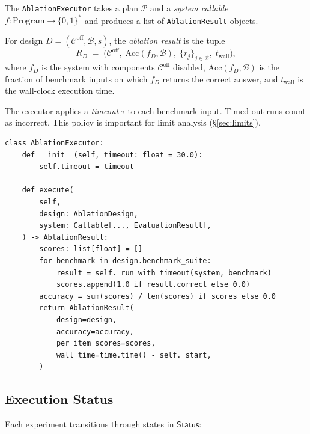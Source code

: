 \documentclass[11pt]{article}
\newcommand{\Acc}{\mathrm{Acc}}             %
\newcommand{\CompSet}{\mathcal{C}}          %
\newcommand{\AblStatus}{\mathsf{Status}}    %
\begin{document}
The \texttt{AblationExecutor} takes a plan $\mathcal{P}$ and a
\emph{system callable} $f : \mathrm{Program} \to \{0,1\}^*$ and
produces a list of \texttt{AblationResult} objects.

\begin{definition}
\label{def:ablation-result}
For design $D = (\CompSet^{\mathrm{off}}, \mathcal{B}, s)$, the
\emph{ablation result} is the tuple
\[
  R_D \;=\; \bigl(\CompSet^{\mathrm{off}},\;\Acc(f_D, \mathcal{B}),\;
             \{r_j\}_{j \in \mathcal{B}},\; t_{\mathrm{wall}}\bigr),
\]
where $f_D$ is the system with components $\CompSet^{\mathrm{off}}$
disabled, $\Acc(f_D, \mathcal{B})$ is the fraction of benchmark inputs
on which $f_D$ returns the correct answer, and $t_{\mathrm{wall}}$ is
the wall-clock execution time.
\end{definition}

The executor applies a \emph{timeout} $\tau$ to each benchmark input.
Timed-out runs count as incorrect.  This policy is important for limit
analysis (§\ref{sec:limits}).

\begin{lstlisting}[style=jugeo-python,caption={AblationExecutor.execute (ablation\_design.py)}]
class AblationExecutor:
    def __init__(self, timeout: float = 30.0):
        self.timeout = timeout

    def execute(
        self,
        design: AblationDesign,
        system: Callable[..., EvaluationResult],
    ) -> AblationResult:
        scores: list[float] = []
        for benchmark in design.benchmark_suite:
            result = self._run_with_timeout(system, benchmark)
            scores.append(1.0 if result.correct else 0.0)
        accuracy = sum(scores) / len(scores) if scores else 0.0
        return AblationResult(
            design=design,
            accuracy=accuracy,
            per_item_scores=scores,
            wall_time=time.time() - self._start,
        )
\end{lstlisting}

\subsection{Execution Status}
\label{subsec:status}

Each experiment transitions through states in $\AblStatus$:

\begin{center}
\end{center}
\end{document}
